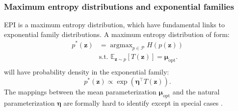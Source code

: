 \documentclass[11pt]{article}
\DeclareMathOperator*{\argmax}{argmax}
\begin{document}
\subsubsection{Maximum entropy distributions and exponential families}\label{methods_ME_EF}
EPI is a maximum entropy distribution, which have fundamental links to exponential family distributions. 
A maximum entropy distribution of form:
\begin{equation} \label{eq:max_ent}
\begin{split}
p^*(\mathbf{z}) &= \argmax_{p \in \mathcal{P}} H(p(\mathbf{z})) \\
 &  \text{s.t.  } \mathbb{E}_{\mathbf{z} \sim p}\left[T(\mathbf{z})\right] = \bm{\mu}_{\text{opt}}. \\
 \end{split}
\end{equation} 
will have probability density in the exponential family:
\begin{equation}
p^*(\mathbf{z}) \propto \exp(\bm{\eta}^\top T(\textbf{z})).
\end{equation}
The mappings between the mean parameterization $\bm{\mu}_{\text{opt}}$ and the natural parameterization $\bm{\eta}$ are formally hard to identify except in special cases \cite{wainwright2008graphical}.
\end{document}
